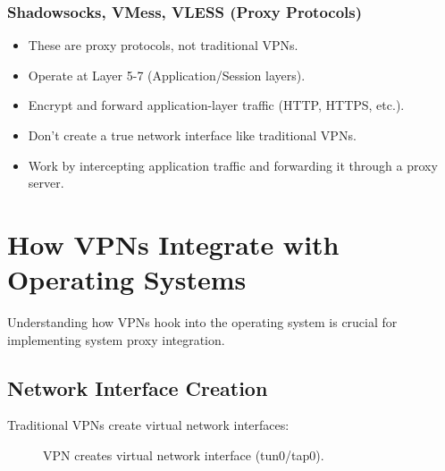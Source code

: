 \subsubsection{Shadowsocks, VMess, VLESS (Proxy Protocols)}
\begin{itemize}
    \item These are proxy protocols, not traditional VPNs.
    \item Operate at Layer 5-7 (Application/Session layers).
    \item Encrypt and forward application-layer traffic (HTTP, HTTPS, etc.).
    \item Don't create a true network interface like traditional VPNs.
    \item Work by intercepting application traffic and forwarding it through a proxy server.
\end{itemize}

\section{How VPNs Integrate with Operating Systems}

Understanding how VPNs hook into the operating system is crucial for implementing system proxy integration.

\subsection{Network Interface Creation}

Traditional VPNs create virtual network interfaces:

\begin{figure}[h]
    \centering
    \caption{VPN creates virtual network interface (tun0/tap0).}
\end{figure}

